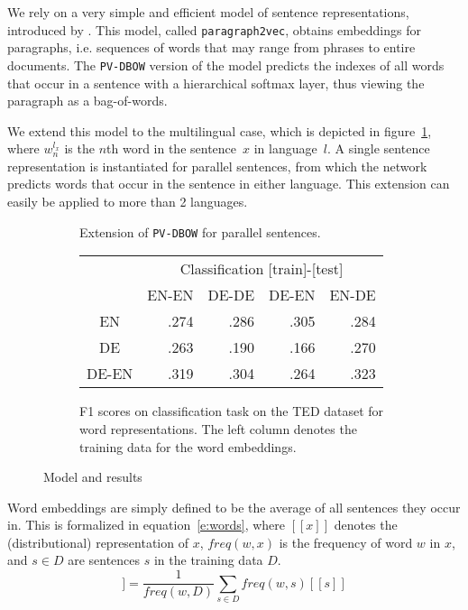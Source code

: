 \documentclass[a4paper,11pt]{article}
\begin{document}
We rely on a very simple and efficient model of sentence representations, introduced by \cite{le2014distributed}.
This model, called {\tt paragraph2vec}, obtains embeddings for paragraphs, i.e. sequences of words that may range from phrases  to entire documents. The {\tt PV-DBOW} version of the model predicts the indexes of all words that occur in a sentence with a hierarchical softmax layer, thus viewing the paragraph as a bag-of-words. 

We extend this model to the multilingual case, which is depicted in figure~\ref{f:model}, where $w_n^{l_x}$ is the $n$th word in the sentence~$x$ in language~$l$. A single sentence representation is instantiated for parallel sentences, from which the network predicts words that occur in the sentence in either language. This extension can easily be applied to more than 2 languages.%

\begin{figure}\center
\begin{subfigure}{.49\linewidth}
\center

\caption{Extension of {\tt PV-DBOW} for parallel sentences.}
\label{f:model}
\end{subfigure}
\begin{subfigure}{.49\linewidth}
\flushright
\begin{tabular}{c | r r r r }
&	\multicolumn{4}{c}{Classification [train]-[test]}	\\
	&EN-EN	&DE-DE	&DE-EN	&EN-DE		\\\hline
EN			&.274		&.286		&.305		&.284		\\
DE			&.263		&.190		&.166		&.270		\\
DE-EN			&.319		&.304		&.264		&.323		\\
\end{tabular}
\caption{F1 scores on classification task on the TED dataset for word representations. The left column denotes the training data for the word embeddings.}
\label{t:dbow_mono_bi}
\end{subfigure}
\caption{Model and results}
\end{figure}


Word embeddings are simply defined to be the average of all sentences they occur in. This is  formalized in equation~\ref{e:words}, where $[\![ x ]\!]$ denotes the (distributional) representation of $x$, $freq(w,x)$ is the frequency of word $w$ in $x$, and $s\in D$ are sentences $s$ in the training data $D$.
\begin{equation}
[\![ w ]\!] =\frac{1}{freq(w,D)}\sum_{s\in D}freq(w,s) [\![ s ]\!]
\label{e:words}
\end{equation}
\end{document}
